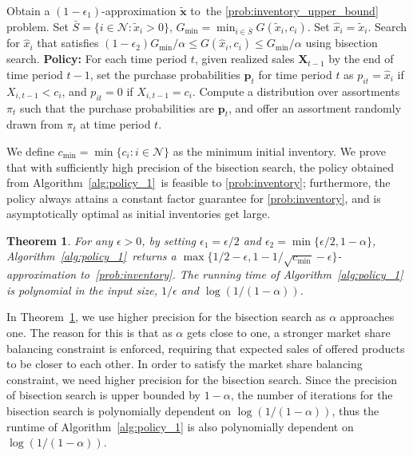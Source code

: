 \documentclass[mnsc,non-blindrev]{informs3}
\newtheorem{theorem}{Theorem}[section]
\theoremstyle{definition}
\begin{document}
\begin{algorithm}[t]
\SingleSpacedXI
\caption{Asymptotically Optimal Policy for \ref{prob:inventory} when $\alpha<1$}
\label{alg:policy_1}
\begin{algorithmic}
\State Obtain a $(1-\epsilon_1)$-approximation $\tilde{\bm{x}}$ to~the \ref{prob:inventory_upper_bound} problem.
\State Set $\bar{S}=\{i\in\mathcal{N}:\tilde{x}_i>0\}$, $G_{\min}=\min_{i\in\bar{S}} G(\tilde{x}_i,c_i)$.
\State Set $\hat{x}_i=\tilde{x}_i$.
\Else
\State Search for $\hat{x}_i$ that satisfies $(1-\epsilon_2)G_{\min}/\alpha\leq G(\hat{x}_i,c_i)\leq G_{\min}/\alpha$ using bisection search.
\EndIf
\EndFor
\State \textbf{Policy:} For each time period $t$, given realized sales $\bm{X}_{t-1}$ by the end of time period $t-1$, set the purchase probabilities $\bm{p}_t$ for time period $t$ as $p_{it}=\hat{x}_i$ if $X_{i,t-1}<c_i$, and $p_{it}=0$ if $X_{i,t-1}=c_i$. Compute a distribution over assortments $\pi_t$ such that the purchase probabilities are $\bm{p}_t$, and offer an assortment randomly drawn from $\pi_t$ at time period $t$.
\end{algorithmic}
\end{algorithm}

We define $c_{\min}=\min\{c_i:i\in\mathcal{N}\}$ as the minimum initial inventory. We prove that with sufficiently high precision of the bisection search, the policy obtained from Algorithm~\ref{alg:policy_1}~is feasible to \ref{prob:inventory}; furthermore, the policy always attains a constant factor guarantee for \ref{prob:inventory}, and is asymptotically optimal as initial inventories get large.

\vspace{0.5em}

\begin{theorem}\label{thm:inventory_constant_1}
For any $\epsilon>0$, by setting $\epsilon_1=\epsilon/2$ and $\epsilon_2=\min\{\epsilon/2,1-\alpha\}$, Algorithm~\ref{alg:policy_1}~returns a $\max\{1/2-\epsilon,1-{1}/{\sqrt{c_{\min}}}-\epsilon\}$-approximation to~\ref{prob:inventory}. The running time of Algorithm~\ref{alg:policy_1} is polynomial in the input size, $1/\epsilon$ and $\log(1/(1-\alpha))$.
\end{theorem}

\vspace{0.5em}

In Theorem~\ref{thm:inventory_constant_1}, we use higher precision for the bisection search as $\alpha$ approaches one. The reason for this is that as $\alpha$ gets close to one, a stronger market share balancing constraint is enforced, requiring that expected sales of offered products to be closer to each other. In order to satisfy the market share balancing constraint, we need higher precision for the bisection search. Since the precision of bisection search is upper bounded by $1-\alpha$, the number of iterations for the bisection search is polynomially dependent on $\log(1/(1-\alpha))$, thus the runtime of Algorithm~\ref{alg:policy_1} is also polynomially dependent on $\log(1/(1-\alpha))$.
\end{document}
